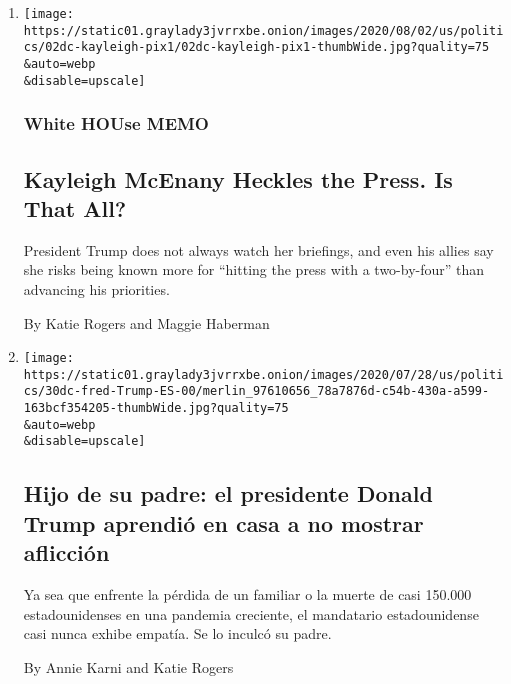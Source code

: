 \begin{enumerate}
\def\labelenumi{\arabic{enumi}.}
\item
  \href{/2020/08/02/us/politics/kayleigh-mcenany.html}{}

  \texttt{[image: https://static01.graylady3jvrrxbe.onion/images/2020/08/02/us/politics/02dc-kayleigh-pix1/02dc-kayleigh-pix1-thumbWide.jpg?quality=75\\\&auto=webp\\\&disable=upscale]}

  \hypertarget{white-house-memo}{%
  \subsubsection{White HOUse MEMO}\label{white-house-memo}}

  \hypertarget{kayleigh-mcenany-heckles-the-press-is-that-all}{%
  \subsection{Kayleigh McEnany Heckles the Press. Is That
  All?}\label{kayleigh-mcenany-heckles-the-press-is-that-all}}

  President Trump does not always watch her briefings, and even his
  allies say she risks being known more for ``hitting the press with a
  two-by-four'' than advancing his priorities.

  By Katie Rogers and Maggie Haberman
\item
  \href{/es/2020/07/31/espanol/estados-unidos/fred-trump-donald-trump.html}{}

  \texttt{[image: https://static01.graylady3jvrrxbe.onion/images/2020/07/28/us/politics/30dc-fred-Trump-ES-00/merlin\_97610656\_78a7876d-c54b-430a-a599-163bcf354205-thumbWide.jpg?quality=75\\\&auto=webp\\\&disable=upscale]}

  \hypertarget{hijo-de-su-padre-el-presidente-donald-trump-aprendiuxf3-en-casa-a-no-mostrar-aflicciuxf3n}{%
  \subsection{Hijo de su padre: el presidente Donald Trump aprendió en
  casa a no mostrar
  aflicción}\label{hijo-de-su-padre-el-presidente-donald-trump-aprendiuxf3-en-casa-a-no-mostrar-aflicciuxf3n}}

  Ya sea que enfrente la pérdida de un familiar o la muerte de casi
  150.000 estadounidenses en una pandemia creciente, el mandatario
  estadounidense casi nunca exhibe empatía. Se lo inculcó su padre.

  By Annie Karni and Katie Rogers


\end{enumerate}
